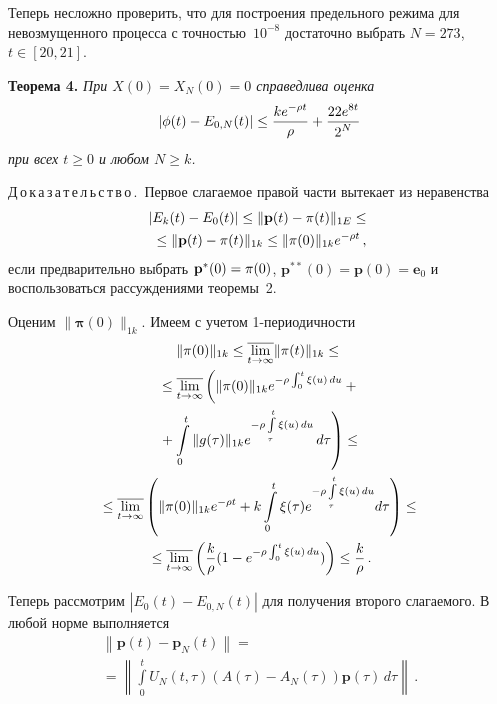 \begin{multicols}{2}
\smallskip
Теперь несложно проверить, что для построения предельного режима для невозмущенного процесса с точностью~$10^{-8}$
достаточно выбрать
$N=273$, $t\in [20,21]$.

\medskip

\noindent

\textbf{Теорема 4.}
\textit{При $X(0) = X_N (0) = 0$ справедлива оценка}
\begin{equation*}
\left|\phi(t)- E_{0,N}(t)\right| \le  \displaystyle\frac{\displaystyle k e^{-\rho t}\mathstrut}{\displaystyle \rho\mathstrut}+\displaystyle\frac{\displaystyle 22 e^{8 t}\mathstrut}{\displaystyle 2^{N}\mathstrut}
\end{equation*}
\textit{при всех $t \ge 0$ и любом $N\ge k$.}

\medskip

\noindent
Д\,о\,к\,а\,з\,а\,т\,е\,л\,ь\,с\,т\,в\,о\,.\ 
Первое слагаемое правой час\-ти вытекает из неравенства
\begin{multline*}
\left|E_k(t) - E_0(t)\right| \le \|{\mathbf p}(t)-{\bf \pi}(t)\|_{1E} \le {}\\
{}\le \|{\mathbf p}(t)-{\bf \pi}(t)\|_{1k} \le 
\|\pi(0)\|_{1k} e^{-\rho t}\,,
\end{multline*}
если предварительно выбрать ${\mathbf p}^*(0) = {\bf \pi}(0)$, ${\mathbf p}^{**}(0) = {\mathbf p}(0)= {\mathbf e}_0$ 
и воспользоваться рассуждениями теоремы~2.

Оценим $\|{\mathbf \pi} (0)\|_{1k}$. Имеем с учетом 1-пе\-ри\-о\-дич\-ности
\begin{multline*}
 \|{\mathbf \pi} (0)\|_{1k} \le \overline{\lim_{t \to \infty}}
\|{\bf \pi} (t)\|_{1k} \le{}\\
{}\le \overline{\lim_{t \to \infty}} \left( \|{\bf \pi} (0)\|_{1k}
e^{-\rho \int_0^t \xi (u)\, du}+{}\right.\\
\left.{}+
\int\limits_0^t {\|g(\tau)\|_{1k} e^{-\rho \int\limits_{\tau}^t \xi (u)\, du}\, d\tau} \right) \le{}\\
{}\le \overline{\lim_{t \to \infty}} \left( \|{\mathbf \pi} (0)\|_{1k} e^{-\rho t} + 
k\int\limits_0^t {\xi(\tau) e^{-\rho \int\limits_{\tau}^t \xi (u)\, du} d\tau} \right) \le{}\\
{}\le  \overline{\lim_{t \to \infty}} \left(\displaystyle\frac{\displaystyle k\mathstrut}{\displaystyle \rho\mathstrut} (1-e^{-\rho \int_0^t \xi (u)\, du}) \right) \le  \displaystyle\frac{\displaystyle k\mathstrut}{\displaystyle \rho\mathstrut}\,.
\end{multline*}

\medskip
Теперь рассмотрим $\left|E_0(t)- E_{0,N}(t)\right|$ для получения второго слагаемого.
В любой норме выполняется
\begin{multline*}
\left\|{\mathbf p} (t) - {\mathbf p}_N (t)\right\| = {}\\
{}=\left\|\int\limits_0^t
U_N \left(t,
 \tau\right) \left(A(\tau) - A_N(\tau) \right) {\mathbf p} (\tau)\, d\tau \right\|\,.
\end{multline*}


\end{multicols}
